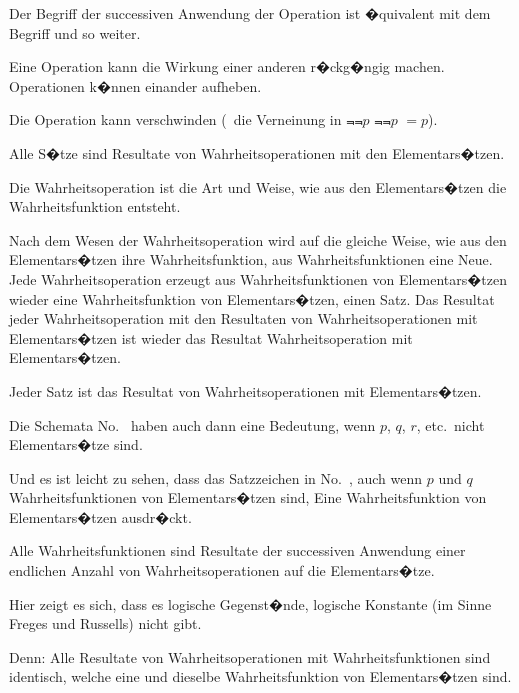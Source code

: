 {Der Begriff der successiven Anwendung der
Operation ist �quivalent mit dem Begriff \glqq{}und so
weiter\grqq{}.}


{Eine Operation kann die Wirkung einer anderen
r�ckg�ngig machen. Operationen k�nnen einander
aufheben.}


{\stretchyspace
{Die Operation kann verschwinden (\zumBeispiel\ die
Verneinung in \glqq{}$\Not{\Not{p}}$\grqq{}\DPtypo{}{,} $\Not{\Not{p}}$ $= p$).}}


{Alle S�tze sind Resultate von Wahrheitsoperationen
mit den Elementars�tzen.

Die Wahrheitsoperation ist die Art und Weise,
wie aus den Elementars�tzen die Wahrheitsfunktion
entsteht.

{\verystretchyspace
Nach dem Wesen der Wahrheitsoperation wird
auf die gleiche Weise, wie aus den Elementars�tzen
ihre Wahrheitsfunktion, aus Wahrheitsfunktionen
eine Neue. Jede Wahrheitsoperation erzeugt aus
Wahrheitsfunktionen von Elementars�tzen wieder
eine Wahrheitsfunktion von Elementars�tzen, einen
Satz. Das Resultat jeder Wahrheitsoperation mit
den Resultaten von Wahrheitsoperationen mit
Elementars�tzen ist wieder das Resultat 
Wahrheitsoperation mit Elementars�tzen.}

Jeder Satz ist das Resultat von Wahrheitsoperationen
mit Elementars�tzen.}


{Die Schemata No.~ haben auch dann eine
Bedeutung, wenn \glqq{}$p$\grqq{}, \glqq{}$q$\grqq{}, \glqq{}$r$\grqq{}, etc.\ nicht Elementars�tze
sind.

{\verystretchyspace
Und es ist leicht zu sehen, dass das Satzzeichen
in No.~, auch wenn \glqq{}$p$\grqq{} und \glqq{}$q$\grqq{} Wahrheitsfunktionen
von Elementars�tzen sind, Eine
Wahrheitsfunktion von Elementars�tzen ausdr�ckt.}}


{Alle Wahrheitsfunktionen sind Resultate der
successiven Anwendung einer endlichen Anzahl
von Wahrheitsoperationen auf die Elementars�tze.}


{Hier zeigt es sich, dass es \glqq{}logische Gegenst�nde\grqq{},
\glqq{}logische Konstante\grqq{} (im Sinne Freges
und Russells) nicht gibt.}


{Denn: Alle Resultate von Wahrheitsoperationen
mit Wahrheitsfunktionen sind identisch,
welche eine und dieselbe Wahrheitsfunktion von
Elementars�tzen sind.}


